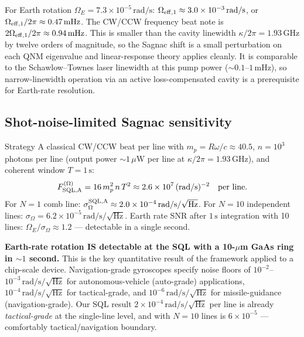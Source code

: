 \documentclass[11pt]{article}
\newcommand{\eff}{{\rm eff}}
\begin{document}
For Earth rotation $\Omega_E = 7.3\times 10^{-5}\,\mathrm{rad/s}$:
$\Omega_{\eff,1} \approx 3.0\times 10^{-3}\,\mathrm{rad/s}$, or
$\Omega_{\eff,1}/2\pi \approx 0.47\,\mathrm{mHz}$.  The CW/CCW
frequency beat note is $2\Omega_{\eff,1}/2\pi \approx 0.94\,\mathrm{mHz}$.
This is smaller than the cavity linewidth $\kappa/2\pi = 1.93\,\mathrm{GHz}$
by twelve orders of magnitude, so the Sagnac shift is a small
perturbation on each QNM eigenvalue and linear-response theory applies
cleanly.  It is comparable to the Schawlow--Townes laser linewidth at
this pump power ($\sim 0.1$--$1\,\mathrm{mHz}$), so narrow-linewidth
operation via an active loss-compensated cavity is a prerequisite for
Earth-rate resolution.

\subsection{Shot-noise-limited Sagnac sensitivity}
\label{sec:example_SQL}

Strategy A classical CW/CCW beat per line with $m_p = R\omega/c\approx 40.5$,
$n=10^3$ photons per line (output power $\sim 1\,\mu\mathrm{W}$ per line
at $\kappa/2\pi = 1.93\,\mathrm{GHz}$), and coherent window $T=1\,\mathrm{s}$:
\begin{equation}
  F_{\rm SQL,A}^{(\Omega)} = 16\, m_p^2 \, n \, T^2 \approx 2.6\times 10^7\,
  (\mathrm{rad/s})^{-2}\quad\text{per line.}
\end{equation}
For $N=1$ comb line:
$\sigma_\Omega^{\rm SQL,A} \approx 2.0\times 10^{-4}\,\mathrm{rad/s}/\sqrt{\mathrm{Hz}}$.
For $N=10$ independent lines:
$\sigma_\Omega = 6.2\times 10^{-5}\,\mathrm{rad/s}/\sqrt{\mathrm{Hz}}$.
Earth rate SNR after $1\,\mathrm{s}$ integration with 10 lines:
$\Omega_E/\sigma_\Omega \approx 1.2$ --- detectable in a single second.

\textbf{Earth-rate rotation IS detectable at the SQL with a 10-$\mu$m
GaAs ring in $\sim 1$ second.}  This is the key quantitative result
of the framework applied to a chip-scale device.  Navigation-grade
gyroscopes specify noise floors of
$10^{-2}$--$10^{-3}\,\mathrm{rad/s}/\sqrt{\mathrm{Hz}}$ for
autonomous-vehicle (auto-grade) applications,
$10^{-4}\,\mathrm{rad/s}/\sqrt{\mathrm{Hz}}$ for tactical-grade, and
$10^{-6}\,\mathrm{rad/s}/\sqrt{\mathrm{Hz}}$ for missile-guidance
(navigation-grade).  Our SQL result $2\times 10^{-4}\,\mathrm{rad/s}/\sqrt{\mathrm{Hz}}$
per line is already \emph{tactical-grade} at the single-line level,
and with $N=10$ lines is $6\times 10^{-5}$ --- comfortably
tactical/navigation boundary.
\end{document}
